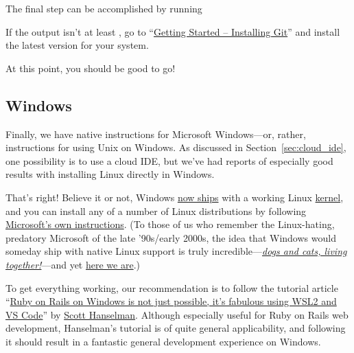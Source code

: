 The final step can be accomplished by running


\noindent If the output isn't at least , go to ``\href{https://git-scm.com/book/en/v2/Getting-Started-Installing-Git}{Getting Started – Installing Git}'' and install the latest version for your system.

At this point, you should be good to go!


\subsection{Windows} %
\label{sec:windows}

Finally, we have native instructions for Microsoft Windows---or, rather, instructions for using Unix on Windows. As discussed in Section~\ref{sec:cloud_ide}, one possibility is to use a cloud IDE, but we've had reports of especially good results with installing Linux directly in Windows.

That's right! Believe it or not, Windows \href{https://devblogs.microsoft.com/commandline/announcing-wsl-2/}{now ships} with a working Linux \href{https://en.wikipedia.org/wiki/Kernel_(operating_system)}{kernel}, and you can install any of a number of Linux distributions by following \href{https://docs.microsoft.com/en-us/windows/wsl/install-win10}{Microsoft's own instructions}. (To those of us who remember the Linux-hating, predatory Microsoft of the late '90s/early 2000s, the idea that Windows would someday ship with native Linux support is truly incredible---\href{https://youtu.be/JmzuRXLzqKk}{\emph{dogs and cats, living together!}}---and yet \href{https://docs.microsoft.com/en-us/windows/wsl/install-win10}{here we are}.)

To get everything working, our recommendation is to follow the tutorial article ``\href{https://www.hanselman.com/blog/RubyOnRailsOnWindowsIsNotJustPossibleItsFabulousUsingWSL2AndVSCode.aspx}{Ruby on Rails on Windows is not just possible, it's fabulous using WSL2 and VS Code}'' by \href{https://www.hanselman.com/}{Scott Hanselman}. Although especially useful for Ruby on Rails web development, Hanselman's tutorial is of quite general applicability, and following it should result in a fantastic general development experience on Windows.


